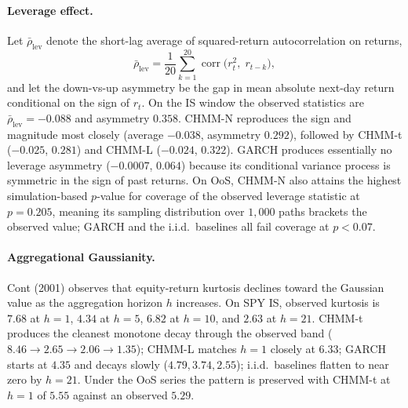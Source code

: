 \paragraph{Leverage effect.}
Let $\bar\rho_{\text{lev}}$ denote the short-lag average of squared-return autocorrelation on returns,
\begin{equation}
    \bar\rho_{\text{lev}} = \frac{1}{20} \sum_{k=1}^{20} \operatorname{corr}\!\bigl(r_t^2,\; r_{t-k}\bigr),
    \label{eq:leverage}
\end{equation}
and let the down-vs-up asymmetry be the gap in mean absolute next-day return conditional on the sign of $r_t$.
On the IS window the observed statistics are $\bar\rho_{\text{lev}} = -0.088$ and asymmetry $0.358$.
CHMM-N reproduces the sign and magnitude most closely (average $-0.038$, asymmetry $0.292$), followed by CHMM-t ($-0.025$, $0.281$) and CHMM-L ($-0.024$, $0.322$).
GARCH produces essentially no leverage asymmetry ($-0.0007$, $0.064$) because its conditional variance process is symmetric in the sign of past returns.
On OoS, CHMM-N also attains the highest simulation-based $p$-value for coverage of the observed leverage statistic at $p = 0.205$, meaning its sampling distribution over $1{,}000$ paths brackets the observed value; GARCH and the i.i.d.\ baselines all fail coverage at $p < 0.07$.

\paragraph{Aggregational Gaussianity.}
Cont (2001) observes that equity-return kurtosis declines toward the Gaussian value as the aggregation horizon $h$ increases.
On SPY IS, observed kurtosis is $7.68$ at $h = 1$, $4.34$ at $h = 5$, $6.82$ at $h = 10$, and $2.63$ at $h = 21$.
CHMM-t produces the cleanest monotone decay through the observed band ($8.46 \to 2.65 \to 2.06 \to 1.35$); CHMM-L matches $h = 1$ closely at $6.33$; GARCH starts at $4.35$ and decays slowly ($4.79, 3.74, 2.55$); i.i.d.\ baselines flatten to near zero by $h = 21$.
Under the OoS series the pattern is preserved with CHMM-t at $h = 1$ of $5.55$ against an observed $5.29$.

